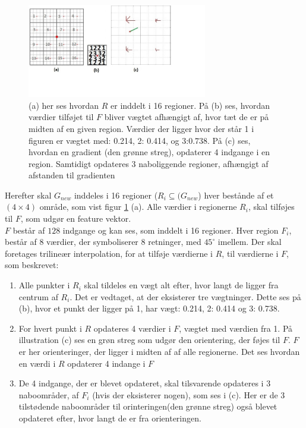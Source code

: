 \begin{figure}[H]
    \centering
    \includegraphics[width=0.70\textwidth]{fig/tilsift.jpg}
     \vspace{-1em}
    \begin{center}    
       \caption{(a) her ses hvordan $R$ er inddelt i 16 regioner. På (b) ses, hvordan værdier tilføjet til $F$ bliver vægtet afhængigt af, hvor tæt de er på midten af en given region. Værdier der ligger hvor der står 1 i figuren er vægtet med: 0.214, 2: 0.414, og 3:0.738. På (c) ses, hvordan en gradient (den grønne streg), opdaterer 4 indgange i en region. Samtidigt opdateres 3 naboliggende regioner, afhængigt af afstanden til gradienten}
    \label{trilinear}
     \end{center}
     \vspace{-2.5em}
  \end{figure} \noindent
Herefter skal $G_{new}$ inddeles i 16 regioner ($R_{i} \subseteq (G_{new}$) hver bestånde af et $(4\times 4)$ område, som vist figur \ref{trilinear} (a). Alle værdier i regionerne $R_i$, skal tilføjes til $F$, som udgør en feature vektor.
\\
$F$ består af $128$ indgange og kan ses, som inddelt i 16 regioner. Hver region $F_i$, består af 8 værdier, der symboliserer 8 retninger, med $45^\circ$ imellem. Der skal foretages trilineær interpolation, for at tilføje værdierne i $R$, til værdierne i $F$, som beskrevet:
\begin{enumerate}
\item{Alle punkter i $R_{i}$ skal tildeles en vægt alt efter, hvor langt de ligger fra centrum af $R_{i}$. Det er vedtaget, at der eksisterer tre vægtninger. Dette ses på (b), hvor et punkt der ligger på  1, har vægt: 0.214, 2: 0.414 og 3: 0.738.}
\item{For hvert punkt i $R$ opdateres 4 værdier i $F$, vægtet med værdien fra 1. På illustration (c) ses en grøn streg som udgør den orientering, der føjes til $F$. $F$ er her orienteringer, der ligger i midten af af alle regionerne. Det ses hvordan en værdi i $R$ opdaterer 4 indange i $F$}
\item{De 4 indgange, der er blevet opdateret, skal tilsvarende opdateres i 3 naboområder, af $F_i$ (hvis der eksisterer nogen), som ses i (c). Her er de 3 tilstødende naboområder til orinteringen(den grønne streg) også blevet opdateret efter, hvor langt de er fra orienteringen.}
\end{enumerate}

